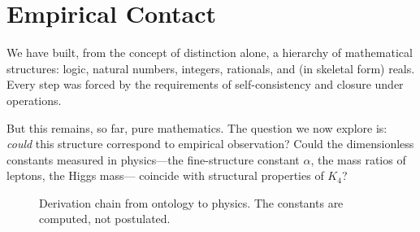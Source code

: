 \documentclass[11pt,a4paper]{book}
\begin{document}
\chapter{Empirical Contact}

We have built, from the concept of distinction alone, a hierarchy of mathematical structures: 
logic, natural numbers, integers, rationals, and (in skeletal form) reals. Every step was 
forced by the requirements of self-consistency and closure under operations.

But this remains, so far, pure mathematics. The question we now explore is: \emph{could} this 
structure correspond to empirical observation? Could the dimensionless constants measured in 
physics—the fine-structure constant $\alpha$, the mass ratios of leptons, the Higgs mass—
coincide with structural properties of $K_4$?

\begin{figure}[h]
\centering
{}
\caption{Derivation chain from ontology to physics. The constants are computed, not postulated.}
\label{fig:ontology-chain}
\end{figure}
\end{document}
